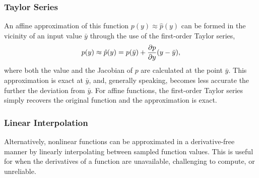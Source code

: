 %
\subsubsection{Taylor Series}
An affine approximation of this function ${p}(y) \approx \hat{p}(y)$ can be formed in the vicinity of an input value $\bar{y}$ through the use of the first-order Taylor series,
%
\begin{align}
    p(y) \approx \hat{p}(y) = p(\bar{y}) + \frac{\partial { p }}{ \partial { y }} (y - \bar{y}),
\end{align}
%
where both the value and the Jacobian of $p$ are calculated at the point $\bar{y}$. This approximation is exact at $\bar{y}$, and, generally speaking, becomes less accurate the further the deviation from $\bar{y}$. For affine functions, the first-order Taylor series simply recovers the original function and the approximation is exact.

%
\subsubsection{Linear Interpolation}
%
Alternatively, nonlinear functions can be approximated in a derivative-free manner by linearly interpolating between sampled function values. This is useful for when the derivatives of a function are unavailable, challenging to compute, or unreliable.
% 

